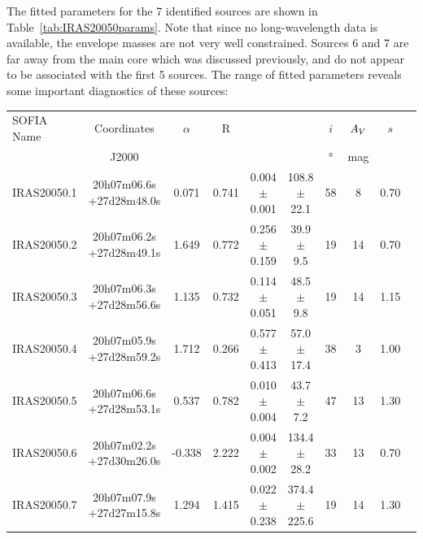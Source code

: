 The fitted parameters for the 7 identified sources are shown in Table~\ref{tab:IRAS20050params}. Note that since no long-wavelength data is available, the envelope masses are not very well constrained. Sources 6 and 7 are far away from the main core which was discussed previously, and do not appear to be associated with the first 5 sources. The range of fitted parameters reveals some important diagnostics of these sources:
\renewcommand{\arraystretch}{1.5}
\def\labelitemi{--}
\begin{table}[!h]
\scriptsize
\caption[Fitted parameters in IRAS~20050+2720]{Fitted parameters of sources in IRAS~20050+2720.}
\label{tab:IRAS20050params}
\vspace{-0.5cm}
\begin{longtable}{lccccccccc}
\toprule																					
SOFIA Name	&	Coordinates	&	$\alpha$	&	R	&	\Menv			&	\Ltot		&	$i$	&	$A_V$	&	$s$	\\
	&	J2000	&		&		&	\si{\Msun}			&	\si{\Lsun}			&	\si{\degree}	&	mag	&		\\
\midrule																					
IRAS20050.1	&	20h07m06.6s +27d28m48.0s	&	0.071	&	0.741	&	0.004	$\pm$	0.001	&	108.8	$\pm$	22.1	&	58	&	8	&	0.70	\\
IRAS20050.2	&	20h07m06.2s +27d28m49.1s	&	1.649	&	0.772	&	0.256	$\pm$	0.159	&	39.9	$\pm$	9.5	&	19	&	14	&	0.70	\\
IRAS20050.3	&	20h07m06.3s +27d28m56.6s	&	1.135	&	0.732	&	0.114	$\pm$	0.051	&	48.5	$\pm$	9.8	&	19	&	14	&	1.15	\\
IRAS20050.4	&	20h07m05.9s +27d28m59.2s	&	1.712	&	0.266	&	0.577	$\pm$	0.413	&	57.0	$\pm$	17.4	&	38	&	3	&	1.00	\\
IRAS20050.5	&	20h07m06.6s +27d28m53.1s	&	0.537	&	0.782	&	0.010	$\pm$	0.004	&	43.7	$\pm$	7.2	&	47	&	13	&	1.30	\\
IRAS20050.6	&	20h07m02.2s +27d30m26.0s	&	-0.338	&	2.222	&	0.004	$\pm$	0.002	&	134.4	$\pm$	28.2	&	33	&	13	&	0.70	\\
IRAS20050.7	&	20h07m07.9s +27d27m15.8s	&	1.294	&	1.415	&	0.022	$\pm$	0.238	&	374.4	$\pm$	225.6	&	19	&	14	&	1.30	\\
\bottomrule																					
	\end{longtable} 
\end{table}


